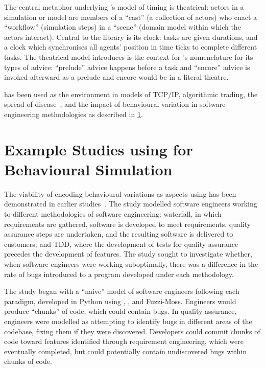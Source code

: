 The central metaphor underlying \theatreag{}'s model of timing is theatrical: actors
in a simulation or model are members of a ``cast'' (a collection of actors) who
enact a ``workflow'' (simulation steps) in a ``scene'' (domain model within
which the actors interact). Central to the library is its clock: tasks are given
durations, and a clock which synchronises all agents' position in time ticks to
complete different tasks. The theatrical model \theatreag{} introduces is the context
for \pdsf{}'s nomenclature for its types of advice: ``prelude'' advice happens
before a task and ``encore'' advice is invoked afterward as a prelude and
encore would be in a literal theatre.

\theatreag{} has been used as the environment in models of TCP/IP, algorithmic
trading, the spread of disease~\cite{aranTheatreThesis}, and the impact of
behavioural variation in software engineering methodologies as described in
\cref{sec:caise_paper}.


\section{Example Studies using \pdsf for Behavioural Simulation}\label{sec:caise_paper}

The viability of encoding behavioural variations as aspects using \pdsf has been
demonstrated in earlier studies~\cite{wallis2018caise,aranTheatreThesis}.
 The study modelled software engineers working to
different methodologies of software engineering: waterfall, in which
requirements are gathered, software is developed to meet requirements, quality
assurance steps are undertaken, and the resulting software is delivered to
customers; and TDD, where the development of tests for quality assurance
precedes the development of features. The study sought to investigate whether,
when software engineers were working suboptimally, there was a difference in the
rate of bugs introduced to a program developed under each methodology.

The study began with a ``naive'' model of software engineers following each
paradigm, developed in Python using \pdsf{}, \theatreag{}, and Fuzzi-Moss. Engineers
would produce ``chunks'' of code, which could contain bugs. In quality
assurance, engineers were modelled as attempting to identify bugs in different
areas of the codebase, fixing them if they were discovered. Developers could
commit chunks of code toward features identified through requirement
engineering, which were eventually completed, but could potentially contain
undiscovered bugs within chunks of code.

